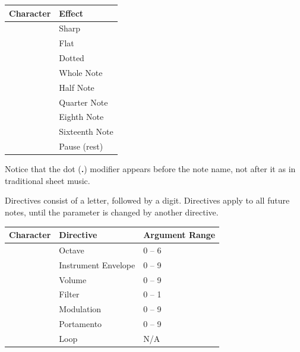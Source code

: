 \begin{description}[leftmargin=2cm,style=nextline]
                  \begin{center}
                  {\setlength{\tabcolsep}{1mm}
                  \begin{tabular}{*{1}{|c}|l|}
                  \hline
                  {\bf Character}  & {\bf Effect} \\
                  \hline
                  \screentext{\#} & Sharp \\
                  \screentext{\$} & Flat \\
                    & Dotted \\
                    & Whole Note \\
                    & Half Note \\
                    & Quarter Note \\
                    & Eighth Note \\
                    & Sixteenth Note \\
                    & Pause (rest) \\
                  \hline
                  \end{tabular}
                  }
                  \end{center}

                  Notice that the dot ({\bf .}) modifier appears before the note name, not after it as in traditional sheet music.

                  Directives consist of a letter, followed by a digit. Directives apply to all future notes, until the parameter is changed by another directive.

                  \begin{center}
                  {\setlength{\tabcolsep}{1mm}
                  \begin{tabular}{*{1}{|C{12mm}}|l|l|}
                  \hline
                  {\bf Character}  & {\bf Directive} & {\bf Argument Range} \\
                  \hline
                   & Octave              & 0 -- 6 \\
                   & Instrument Envelope & 0 -- 9 \\
                   & Volume              & 0 -- 9 \\
                   & Filter              & 0 -- 1 \\
                   & Modulation          & 0 -- 9 \\
                   & Portamento          & 0 -- 9 \\
                   & Loop                & N/A   \\
                  \hline
                  \end{tabular}
                  }
                  \end{center}


\end{description}

